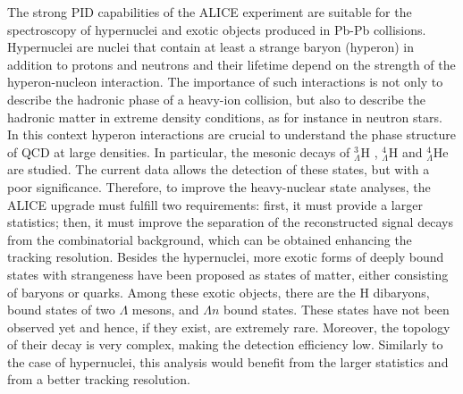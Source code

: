 The strong PID capabilities of the ALICE experiment are suitable for the spectroscopy of hypernuclei and exotic objects produced in Pb-Pb collisions. Hypernuclei are nuclei that contain at least a strange baryon (hyperon) in addition to protons and neutrons and their lifetime depend on the strength of the hyperon-nucleon interaction. The importance of such interactions is not only to describe the hadronic phase of a heavy-ion collision, but also to describe the hadronic matter in extreme density conditions, as for instance in neutron stars. In this context hyperon interactions are crucial to understand the phase structure of QCD at large densities. In particular, the mesonic decays of $^{3}_{\Lambda}$H , $^{4}_{\Lambda}$H  and $^{4}_{\Lambda}$He  are studied. The current data allows the detection of these states, but with a poor significance. Therefore, to improve the heavy-nuclear state analyses, the ALICE upgrade must fulfill two requirements: first, it must provide a larger statistics; then, it must improve the separation of the reconstructed signal decays from the combinatorial background, which can be obtained enhancing the tracking resolution. Besides the hypernuclei, more exotic forms of deeply bound states with strangeness have been proposed as states of matter, either consisting of baryons or quarks. Among these exotic objects, there are the H dibaryons, bound states of two $\Lambda$ mesons, and $\Lambda n$ bound states. These states have not been observed yet and hence, if they exist, are extremely rare. Moreover, the topology of their decay is very complex, making the detection efficiency low. Similarly to the case of hypernuclei, this analysis would benefit from the larger statistics and from a better tracking resolution.
